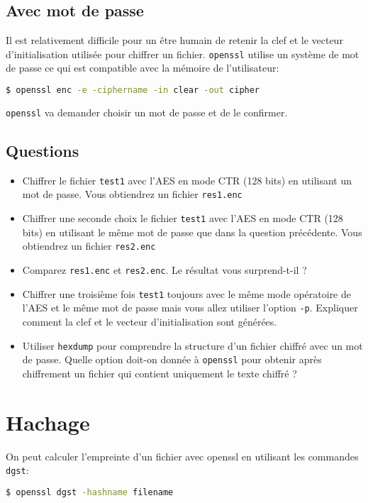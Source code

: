 \documentclass{article}
\begin{document}
\subsection{Avec mot de passe}
Il est relativement difficile pour un être humain de retenir la clef et le vecteur d’initialisation
utilisée pour chiffrer un fichier. \texttt{openssl} utilise un système de mot de passe ce qui est compatible
avec la mémoire de l’utilisateur:
\begin{lstlisting}[language=bash]
$ openssl enc -e -ciphername -in clear -out cipher
\end{lstlisting}

\texttt{openssl} va demander choisir un mot de passe et de le confirmer.


\subsection*{Questions}
\begin{itemize}

\item Chiffrer le fichier \texttt{test1} avec l’AES en mode CTR (128 bits) en utilisant un mot de passe.
Vous obtiendrez un fichier \texttt{res1.enc}
\item Chiffrer une seconde choix le fichier \texttt{test1} avec l’AES en mode CTR (128 bits) en utilisant
le même mot de passe que dans la question précédente. Vous obtiendrez un fichier \texttt{res2.enc}


\item Comparez \texttt{res1.enc} et \texttt{res2.enc}. Le résultat vous surprend-t-il ?
\item Chiffrer une troisième fois \texttt{test1} toujours avec le même mode opératoire de l’AES et le
même mot de passe mais vous allez utiliser l’option \texttt{-p}. Expliquer comment la clef et le vecteur
d’initialisation sont générées.
\item Utiliser \texttt{hexdump} pour comprendre la structure d’un fichier chiffré avec un mot de passe.
Quelle option doit-on donnée à \texttt{openssl} pour obtenir après chiffrement un fichier qui contient
uniquement le texte chiffré ?
\end{itemize}




\section{Hachage}

On peut calculer l’empreinte d’un fichier avec openssl en utilisant les commandes \texttt{dgst}:
\begin{lstlisting}[language=bash]
$ openssl dgst -hashname filename
\end{lstlisting}
\end{document}
